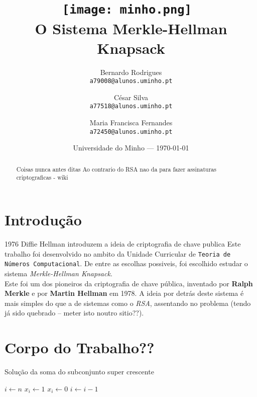 \documentclass[11pt]{report}
\begin{document}
\title{\texttt{[image: minho.png]}~\\[1cm] O Sistema Merkle-Hellman Knapsack}

\author{Bernardo Rodrigues\\ \texttt{a79008@alunos.uminho.pt}\\ \and César Silva\\ \texttt{a77518@alunos.uminho.pt}\\ \and Maria Francisca Fernandes\\ \texttt{a72450@alunos.uminho.pt}\\}

\date{Universidade do Minho --- \today}

\maketitle

\tableofcontents

\begin{abstract}

	Coisas nunca antes ditas
	Ao contrario do RSA nao da para fazer assinaturas criptograficas - wiki

\end{abstract}

\chapter{Introdução}


1976 Diffie Hellman introduzem a ideia de criptografia de chave publica
Este trabalho foi desenvolvido no ambito da Unidade Curricular de \texttt{Teoria de Números Computacional}. De entre as escolhas possiveis, foi escolhido estudar o sistema \textit{Merkle-Hellman Knapsack}. \\
Este foi um dos pioneiros da criptografia de chave pública, inventado por \textbf{Ralph Merkle} e por \textbf{Martin Hellman} em 1978.
A ideia por detrás deste sistema é mais simples do que a de sistemas como o \textit{RSA}, assentando no problema  (tendo já sido quebrado -- meter isto noutro sitio??).

\chapter{Corpo do Trabalho??}

\begin{algorithm}
	\caption{Solução da soma do subconjunto super crescente}
	\begin{algorithmic}[1]
		\State $i \gets n$
				\State $x_i \gets 1$
			\Else
				\State $x_i \gets 0 $
			\EndIf
		\State $i \gets i - 1$
		\EndWhile
\end{algorithmic}
\end{algorithm}
\end{document}
